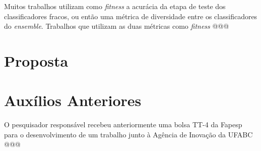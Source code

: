 \documentclass[12pt]{report}
\begin{document}

Muitos trabalhos utilizam como \textit{fitness} a acurácia da etapa de teste dos classificadores fracos, ou então uma métrica de diversidade entre os classificadores do \textit{ensemble}. Trabalhos que utilizam as duas métricas como \textit{fitness} @@@


\chapter{Proposta}




\chapter{Auxílios Anteriores}

O pesquisador responsável recebeu anteriormente uma bolsa TT-4 da Fapesp para o desenvolvimento de um trabalho junto à Agência de Inovação da UFABC @@@ 





\end{document}

